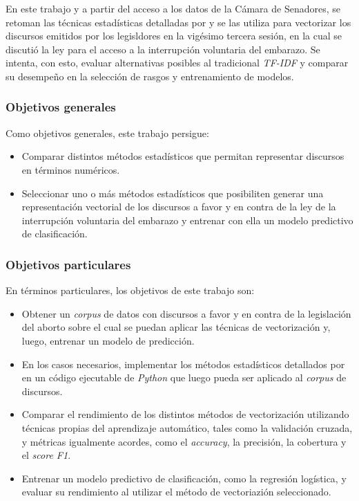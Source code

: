 En este trabajo y a partir del acceso a los datos de la C\'amara de Senadores,
se retoman las t\'ecnicas estad\'isticas detalladas por
\citeauthor{monroe2008fightin} y se las utiliza para vectorizar los
discursos emitidos por los legisldores en la vig\'esimo tercera sesi\'on,
en la cual se discuti\'o la ley para el acceso a
la interrupci\'on voluntaria del embarazo.
Se intenta, con esto, evaluar alternativas posibles al tradicional \textit{TF-IDF}
y comparar su desempeño en la selecci\'on de rasgos y entrenamiento de modelos.

\subsubsection{Objetivos generales}

Como objetivos generales, este trabajo persigue:

\begin{itemize}
    \item{Comparar distintos m\'etodos estad\'isticos que permitan representar
    discursos en t\'erminos num\'ericos.}
    \item{Seleccionar uno o m\'as m\'etodos estad\'isticos que posibiliten
    generar una representaci\'on vectorial de los discursos a favor y en
    contra de la ley de la interrupci\'on voluntaria del embarazo y entrenar
    con ella un modelo predictivo de clasificaci\'on.}
\end{itemize}

\subsubsection{Objetivos particulares}

En t\'erminos particulares, los objetivos de este trabajo son:

\begin{itemize}
    \item{Obtener un \textit{corpus} de datos con discursos a favor y en contra
    de la legislaci\'on del aborto sobre el cual se puedan aplicar las t\'ecnicas de
    vectorizaci\'on y, luego, entrenar un modelo de predicci\'on.}
    \item{En los casos necesarios, implementar los m\'etodos estad\'isticos detallados
    por \cite{monroe2008fightin} en un c\'odigo ejecutable de \textit{Python} que
    luego pueda ser aplicado al \textit{corpus} de discursos.}
    \item{Comparar el rendimiento de los distintos m\'etodos de vectorizaci\'on utilizando
    t\'ecnicas propias del aprendizaje autom\'atico, tales como la validaci\'on
    cruzada, y m\'etricas igualmente acordes, como el \textit{accuracy}, la precisi\'on,
    la cobertura y el \textit{score F1}.}
    \item{Entrenar un modelo predictivo de clasificaci\'on, como la regresi\'on log\'istica,
    y evaluar su rendimiento al utilizar el m\'etodo de vectoriazi\'on seleccionado.}
\end{itemize}
